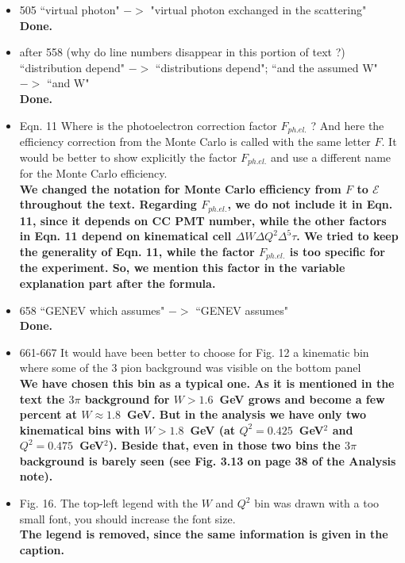 \documentclass[,superscriptaddress,showpacs,amssymb,amsmath,amsfonts,linenumbers,article]{revtex4-1}
\begin{document}
\begin{itemize}
\item 505 ``virtual photon" $->$ "virtual photon exchanged in the scattering"\\
{\bf Done.}

\item after 558 (why do line numbers disappear in this portion of text ?) ``distribution depend" $->$ ``distributions depend"; ``and the assumed W" $->$ ``and W"\\[0.5cm]
{\bf Done.}

\item Eqn. 11 Where is the photoelectron correction factor $F_{ph.el.}$ ? And here the efficiency correction from the Monte Carlo is called with the same letter $F$. It would be better to show explicitly the factor $F_{ph.el.}$ and use a different name for the Monte Carlo efficiency.\\
{\bf We changed the notation for Monte Carlo efficiency from $F$ to $\mathcal{E}$ throughout the text. Regarding $F_{ph.el.}$, we do not include it in Eqn. 11, since it depends on CC PMT number, while the other factors in Eqn. 11 depend on kinematical cell $\Delta W \Delta Q^{2} \Delta^{5}\tau$. We tried to keep the generality of  Eqn. 11, while the factor $F_{ph.el.}$ is too specific for the experiment. So, we mention this factor in the variable explanation part after the formula.}

\item 658 ``GENEV which assumes" $->$ ``GENEV assumes"\\
{\bf Done.}

\item 661-667 It would have been better to choose for Fig. 12 a kinematic bin where some of the 3 pion background was visible on the bottom panel\\
{\bf We have chosen this bin as a typical one. As it is mentioned in the text the $3\pi$ background for $W>1.6$~GeV grows and become a few percent at $W \approx 1.8$~GeV. But in the analysis we have only two kinematical bins with $W > 1.8$~GeV (at $Q^{2} = 0.425$~GeV$^{2}$ and $Q^{2} = 0.475$~GeV$^{2}$). Beside that, even in those two bins the $3\pi$ background is barely seen (see Fig. 3.13 on page 38 of the Analysis note).   
}

\item Fig. 16. The top-left legend with the $W$ and $Q^2$ bin was drawn with a too small font, you should increase the font size.\\
{\bf The legend is removed, since the same information is given in the caption.}


\end{itemize}
\end{document}
